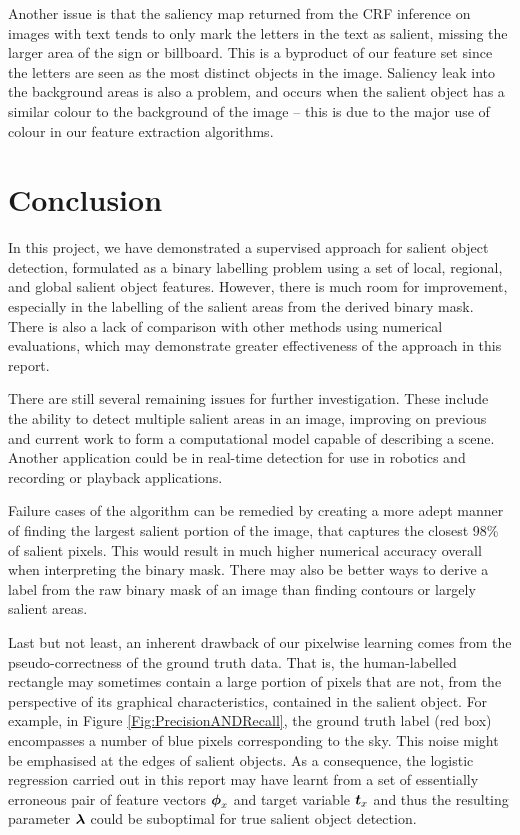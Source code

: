 \documentclass[10pt,twocolumn,letterpaper]{article}
\begin{document}
Another issue is that the saliency map returned from the CRF inference on images with text tends to only mark the letters in the text as salient, missing the larger area of the sign or billboard.  This is a byproduct of our feature set since the letters are seen as the most distinct objects in the image.  Saliency leak into the background areas is also a problem, and occurs when the salient object has a similar colour to the background of the image -- this is due to the major use of colour in our feature extraction algorithms.

\section{Conclusion}

In this project, we have demonstrated a supervised approach for salient object detection, formulated as a binary labelling problem using a set of local, regional, and global salient object features.  However, there is much room for improvement, especially in the labelling of the salient areas from the derived binary mask.  There is also a lack of comparison with other methods using numerical evaluations, which may demonstrate greater effectiveness of the approach in this report.

There are still several remaining issues for further investigation.  These include the ability to detect multiple salient areas in an image, improving on previous and current work to form a computational model capable of describing a scene.  Another application could be in real-time detection for use in robotics and recording or playback applications.

Failure cases of the algorithm can be remedied by creating a more adept manner of finding the largest salient portion of the image, that captures the closest 98\% of salient pixels.  This would result in much higher numerical accuracy overall when interpreting the binary mask.  There may also be better ways to derive a label from the raw binary mask of an image than finding contours or largely salient areas.

Last but not least, an inherent drawback of our pixelwise learning comes from the pseudo-correctness of the ground truth data. That is, the human-labelled rectangle may sometimes contain a large portion of pixels that are not, from the perspective of its graphical characteristics, contained in the salient object. For example, in Figure \ref{Fig:PrecisionANDRecall}, the ground truth label (red box) encompasses a number of blue pixels corresponding to the sky. This noise might be emphasised at the edges of salient objects. As a consequence, the logistic regression carried out in this report may have learnt from a set of essentially erroneous pair of feature vectors $\boldsymbol{\phi}_x$ and target variable $\boldsymbol{t}_x$ and thus the resulting parameter $\boldsymbol{\lambda}$ could be suboptimal for true salient object detection.
\end{document}
